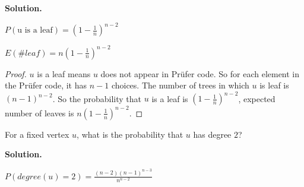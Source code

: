 \textbf{Solution.}
\par $P(\text{u is a leaf}) = (1-\frac{1}{n})^{n-2}$
\par $E(\#leaf) = n(1-\frac{1}{n})^{n-2}$
\begin{proof}
$u$ is a leaf means $u$ does not appear in Pr\"ufer code. So for each element in the Pr\"ufer code, it has $n-1$ choices. The number of trees in which $u$ is leaf is $(n-1)^{n-2}$. So the probability that $u$ is a leaf is $(1-\frac{1}{n})^{n-2}$, expected number of leaves is $n(1-\frac{1}{n})^{n-2}$.
\end{proof}

\begin{exercise}
  For a fixed vertex $u$, what is the probability that $u$ has degree $2$?
\end{exercise}
\textbf{Solution.}
\par $P(degree(u)=2) = \frac{(n-2)(n-1)^{n-3}}{n^{n-2}}$
